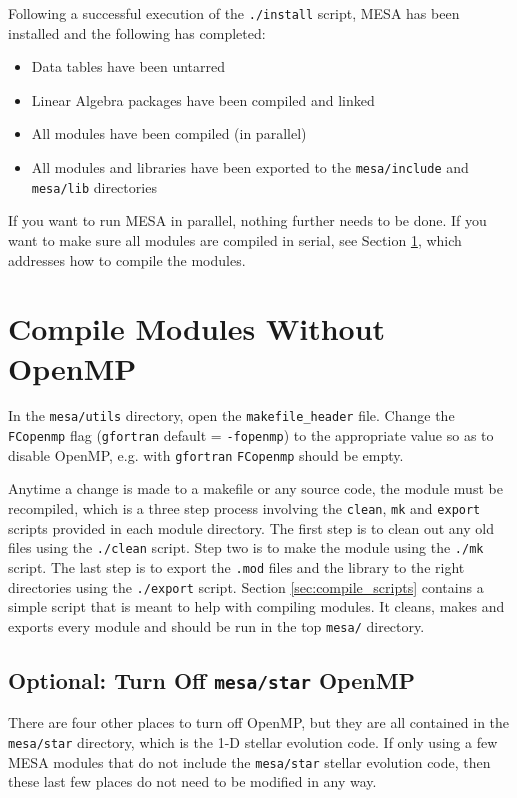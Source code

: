 Following a successful execution of the {\tt ./install} script, 
{\sf MESA} has been installed and the following has completed:
\begin{itemize}
\item Data tables have been untarred
\item Linear Algebra packages have been compiled and linked
\item All modules have been compiled (in parallel)
\item All modules and libraries have been exported to the {\tt mesa/include} 
and {\tt mesa/lib} directories
\end{itemize}

If you want to run {\sf MESA} in parallel, nothing further needs to be done. 
If you want to make sure all modules are compiled in serial, see Section 
\ref{sec:compile_wo_omp}, which addresses how to compile the modules.

\section{Compile Modules Without OpenMP}
\label{sec:compile_wo_omp}

In the {\tt mesa/utils} directory, open the {\tt makefile\_header} file. 
Change the {\tt FCopenmp} flag ({\tt gfortran} default = {\tt -fopenmp}) to 
the appropriate value so as to disable OpenMP, e.g. with {\tt gfortran} 
{\tt FCopenmp} should be empty. 

Anytime a change is made to a makefile or any source code, the module must 
be recompiled, which is a three step process involving the {\tt clean}, 
{\tt mk} and {\tt export} scripts provided in each module directory. The 
first step is to clean out any old files using the {\tt ./clean} script. 
Step two is to make the module using the {\tt ./mk} script. The last step is 
to export the {\tt .mod} files and the library to the right directories using 
the {\tt ./export} script. Section \ref{sec:compile_scripts} contains a 
simple script that is meant to help with compiling modules. It cleans, makes 
and exports every module and should be run in the top {\tt mesa/} directory.

\subsection{Optional: Turn Off {\tt mesa/star} OpenMP}
There are four other places to turn off OpenMP, but they are all contained 
in the {\tt mesa/star} directory, which is the 1-D stellar evolution code. If 
only using a few {\sf MESA} modules that do not include the {\tt mesa/star} 
stellar evolution code, then these last few places do not need to be 
modified in any way. 

